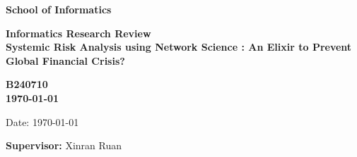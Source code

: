 \documentclass[a4paper,11pt]{article}
\newcommand{\examnumber}{B240710}
\newcommand{\field}{Systemic Risk Analysis using Network Science : An Elixir to Prevent Global Financial Crisis?}
\newcommand{\supervisor}{Xinran Ruan}
\begin{document}
\begin{minipage}[b]{110mm}
        {\Huge\bf School of Informatics
        \vspace*{17mm}}
\end{minipage}
\hfill
\begin{minipage}[t]{40mm}               
\end{minipage}
\par\noindent
\vspace*{2cm}
\begin{center}
        \Large\bf Informatics Research Review \\
        \Large\bf \field
\end{center}
\vspace*{1.5cm}
\begin{center}
        \bf \examnumber\\
        \monthyeardate\today
\end{center}
\vspace*{5mm}

%
%                       
\begin{abstract}
The emerging global financial system marked a new era where institutions, markets, and players are interconnected and depending on each other. Although it boosts global economic progress, it is exposed to systemic risk due to its properties. The understanding of network science appears as one of promising approaches to manage such risk because of its properties that resemble real-world systems and abilities to uncover covert insights from it. In this review, the multiple approaches of combination of network science and financial model will be thoroughly examined in order to do systemic risk analysis in global stock indexes and banking systems during the 2020 COVID recession and 2007 great recession.
\end{abstract}

\vspace*{1cm}

\vspace*{3cm}
Date: \today

\vfill
{\bf Supervisor:} \supervisor
\newpage

\setcounter{page}{1}                            %
\footruleheight{1pt}
\headruleheight{1pt}
\rhead{- \thepage}
\cfoot{}
%
\end{document}

